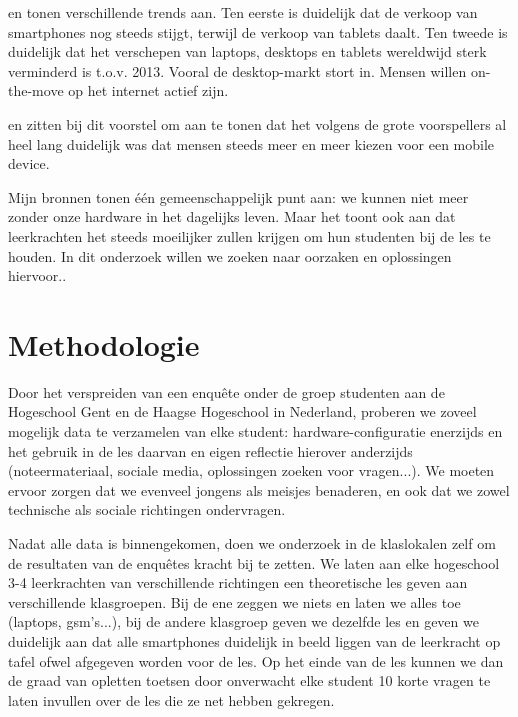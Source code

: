 \textcite{2} en \textcite{1} tonen verschillende trends aan. Ten eerste is duidelijk dat de verkoop van smartphones nog steeds stijgt, terwijl de verkoop van tablets daalt. Ten tweede is duidelijk dat het verschepen van laptops, desktops en tablets wereldwijd sterk verminderd is t.o.v. 2013. Vooral de desktop-markt stort in. Mensen willen on-the-move op het internet actief zijn.

\textcite{4} en \textcite{5} zitten bij dit voorstel om aan te tonen dat het volgens de grote voorspellers al heel lang duidelijk was dat mensen steeds meer en meer kiezen voor een mobile device. 

Mijn bronnen tonen één gemeenschappelijk punt aan: we kunnen niet meer zonder onze hardware in het dagelijks leven. Maar het toont ook aan dat leerkrachten het steeds moeilijker zullen krijgen om hun studenten bij de les te houden. In dit onderzoek willen we zoeken naar oorzaken en oplossingen hiervoor..

\section{Methodologie}
\label{sec:methodologie}

Door het verspreiden van een enquête onder de groep studenten aan de Hogeschool Gent en de Haagse Hogeschool in Nederland, proberen we zoveel mogelijk data te verzamelen van elke student: hardware-configuratie enerzijds en het gebruik in de les daarvan en eigen reflectie hierover anderzijds (noteermateriaal, sociale media, oplossingen zoeken voor vragen...). We moeten ervoor zorgen dat we evenveel jongens als meisjes benaderen, en ook dat we zowel technische als sociale richtingen ondervragen. 

Nadat alle data is binnengekomen, doen we onderzoek in de klaslokalen zelf om de resultaten van de enquêtes kracht bij te zetten. We laten aan elke hogeschool 3-4 leerkrachten van verschillende richtingen een theoretische les geven aan verschillende klasgroepen. Bij de ene zeggen we niets en laten we alles toe (laptops, gsm's...), bij de andere klasgroep geven we dezelfde les en geven we duidelijk aan dat alle smartphones duidelijk in beeld liggen van de leerkracht op tafel ofwel afgegeven worden voor de les. Op het einde van de les kunnen we dan de graad van opletten toetsen door onverwacht elke student 10 korte vragen te laten invullen over de les die ze net hebben gekregen.  

